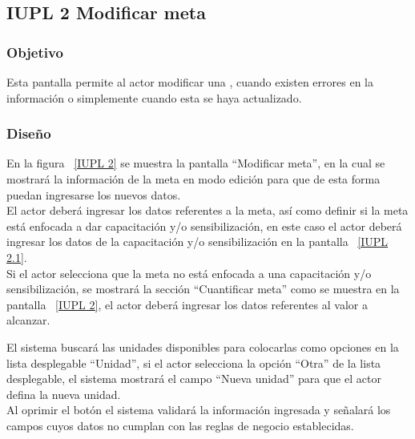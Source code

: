 \subsection{IUPL 2 Modificar meta}
                     
\subsubsection{Objetivo}

   Esta pantalla permite al actor modificar una , cuando existen errores en la información o simplemente cuando esta se haya actualizado.

	
\subsubsection{Diseño}
  En la figura ~\ref{IUPL 2} se muestra la pantalla ``Modificar meta'', en la cual se mostrará la información de la meta en modo edición para que
  de esta forma puedan ingresarse los nuevos datos.\\

  El actor deberá ingresar los datos referentes a la meta, así como definir si la meta está enfocada a dar capacitación y/o sensibilización, en este caso el 
  actor deberá ingresar los datos de la capacitación y/o sensibilización en la pantalla ~\ref{IUPL 2.1}.\\
  
  Si el actor selecciona que la meta no está enfocada a una capacitación y/o sensibilización, se mostrará la sección ``Cuantificar meta'' como se muestra en la pantalla ~\ref{IUPL 2}, el actor 
  deberá ingresar los datos referentes al valor a alcanzar.\\
 
  
  El sistema buscará las unidades disponibles para colocarlas como opciones en la lista desplegable ``Unidad'', si el actor selecciona la opción ``Otra'' de la lista desplegable, el sistema mostrará
  el campo ``Nueva unidad'' para que el actor defina la nueva unidad.\\
  
  Al oprimir el botón  el sistema validará la información ingresada y señalará los campos cuyos datos no cumplan con las reglas de negocio establecidas.\\
  
